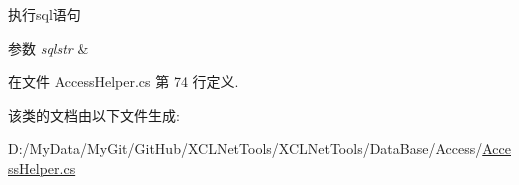执行sql语句 


\begin{DoxyParams}{参数}
{\em sqlstr} & \\
\hline
\end{DoxyParams}


在文件 Access\-Helper.\-cs 第 74 行定义.



该类的文档由以下文件生成\-:\begin{DoxyCompactItemize}
\item 
D\-:/\-My\-Data/\-My\-Git/\-Git\-Hub/\-X\-C\-L\-Net\-Tools/\-X\-C\-L\-Net\-Tools/\-Data\-Base/\-Access/\hyperlink{_access_helper_8cs}{Access\-Helper.\-cs}\end{DoxyCompactItemize}

